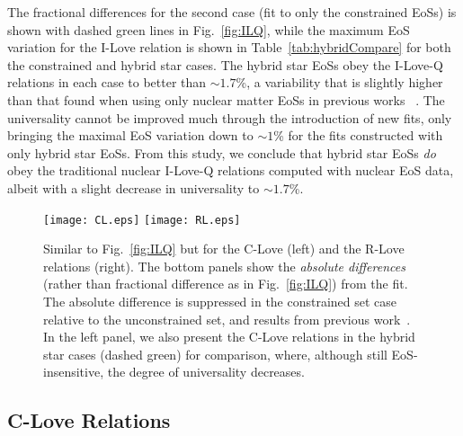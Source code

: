 \documentclass[prd,twocolumn,nofootinbib,superscriptaddress,amsmath,amssymb]{revtex4-1}
\begin{document}
The fractional differences  for the second case (fit to only the constrained EoSs) is shown with dashed green lines in Fig.~\ref{fig:ILQ}, while the maximum EoS variation for the I-Love relation is shown in Table~\ref{tab:hybridCompare} for both the constrained and hybrid star cases. The hybrid star EoSs obey the I-Love-Q relations in each case to better than $\sim1.7$\%, a variability that is slightly higher than that found when using only nuclear matter EoSs in previous works~\cite{Yagi:2013bca,Yagi:ILQ} . The universality cannot be improved much through the introduction of new fits, only bringing the maximal EoS variation down to $\sim1$\% for the fits constructed with only hybrid star EoSs. From this study, we conclude that hybrid star EoSs \emph{do} obey the traditional nuclear I-Love-Q relations computed with nuclear EoS data, albeit with a slight decrease in universality to $\sim1.7$\%.  


\begin{figure*}
\begin{center} 
\texttt{[image: CL.eps]}
\texttt{[image: RL.eps]}
\end{center}
\caption{
Similar to Fig.~\ref{fig:ILQ} but for the C-Love (left) and the R-Love relations (right).  The bottom panels show the \emph{absolute differences} (rather than fractional difference as in Fig.~\ref{fig:ILQ}) from the fit. The absolute difference is suppressed in the constrained set case relative to the unconstrained set, and results from previous work~\cite{Maselli:2013mva}. In the left panel, we also present the C-Love relations in the hybrid star cases (dashed green) for comparison, where, although still EoS-insensitive, the degree of universality decreases. 
}
\label{fig:clove}
\end{figure*} 

\subsection{C-Love Relations}
\label{sec:clove}
\end{document}
